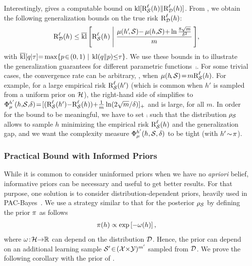 \documentclass[twoside]{article}
\theoremstyle{plain}
\begin{document}
Interestingly,  gives a computable bound on $\kl[\RiskLoss_{\Scal}(h)\|\RiskLoss_{\Dcal}(h)]$.
From , we obtain the following generalization bounds on the true risk $\RiskLoss_{\Dcal}(h)$:
\begin{align}
\RiskLoss_{\Dcal}(h)\le\klmax\LB\RiskLoss_{\Scal}(h) \;\middle|\; \frac{\comp(h'\!,\Scal){-}\comp(h{,}\Scal){+}\ln\tfrac{8\sqrt{m}}{\delta^2}}{m}\,\RB\!,\label{eq:disintegrated-comp-seeger-risk}
\end{align}
with $\klmax[q | \tau]{=}\max\{ p \!\in\! (0,1) \;|\; \kl(q\|p) {\le} \tau\}$.  
We use these bounds in  to illustrate the generalization guarantees for different parametric \mbox{functions $\comp$}.
For some trivial cases, the convergence rate can be arbitrary, \eg, when $\comp(h\!, \Scal)\!=\!m\RiskLoss_{\Scal}(h)$.
For example, for a large empirical risk $\RiskLoss_{\Scal}(h')$ (which is common when $h'$ is sampled from a uniform prior on $\Hcal$), the right-hand side of  simplifies to $\PhiComp^{h'}(h{,}\Scal{,}\delta)\!=\![(\RiskLoss_{\Scal}(h'){-}\RiskLoss_{\Scal}(h)){+}\frac{1}{m}\ln({2\sqrt{m}}/{\delta})]_+$ and is large, for all $m$.
In order for the bound to be meaningful, we have to set $\comp$ such that the distribution $\AQ$ allows to sample $h$ minimizing the empirical risk $\RiskLoss_{\Scal}(h)$ and the generalization gap, and we want the complexity measure $\PhiComp^{h'}(h, \Scal, \delta)$ to be tight (with $h'\!\sim\!\P$).

\subsubsection{Practical Bound with Informed Priors}
\label{sec:result-practical-informed}

While it is common to consider uninformed priors when we have no \textit{apriori} belief, informative priors can be necessary and useful to get better results.
For that purpose, one solution is to consider distribution-dependent priors, heavily used in PAC-Bayes~\citep[see \eg,][]{parradohernandez2012pac,dziugaite2021role,perezortiz2021tighter}.
We use a strategy similar to that for the posterior $\AQ$ by defining the prior $\P$ as follows
\begin{align}
\label{eq:gibbs-distribution-prior}
   \P(h) \propto \exp\LB-\omega(h)\RB,
\end{align}
where $\omega\!:\! \Hcal {\to} \R$ can depend on the distribution $\Dcal$.
Hence, the prior can depend on an additional learning sample $\Scal'\!\in\!(\Xcal{\times}\Ycal)^{m'}$ sampled from $\Dcal$.
We prove the following corollary with the prior of .
\end{document}
